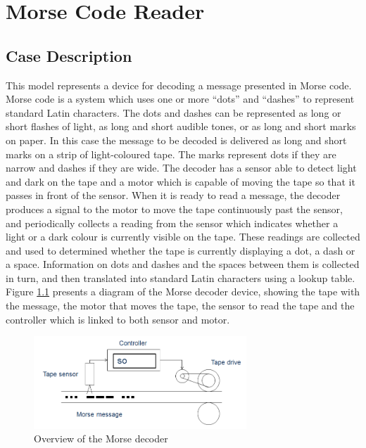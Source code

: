 \chapter{Morse Code Reader} \label{chap:morsecodereader}
\section{Case Description}
This model represents a device for decoding a message presented in
Morse code.  Morse code is a system which uses one or more ``dots''
and ``dashes'' to represent standard Latin characters.  The dots and
dashes can be represented as long or short flashes of light, as long
and short audible tones, or as long and short marks on paper.  In this
case the message to be decoded is delivered as long and short marks on
a strip of light-coloured tape.  The marks represent dots if they are
narrow and dashes if they are wide.  The decoder has a sensor able to
detect light and dark on the tape and a motor which is capable of
moving the tape so that it passes in front of the sensor.  When it is
ready to read a message, the decoder produces a signal to the motor to
move the tape continuously past the sensor, and periodically collects
a reading from the sensor which indicates whether a light or a dark
colour is currently visible on the tape.  These readings are collected
and used to determined whether the tape is currently displaying a dot,
a dash or a space.  Information on dots and dashes and the spaces
between them is collected in turn, and then translated into standard
Latin characters using a lookup table.  Figure \ref{fig:morsereader}
presents a diagram of the Morse decoder device, showing the tape with
the message, the motor that moves the tape, the sensor to read the
tape and the controller which is linked to both sensor and motor.

\begin{figure}[!ht]
\centering
\includegraphics[width=8cm]{morseCodeReader/MorseTapeReader.png}
\caption{Overview of the Morse decoder \label{fig:morsereader}}
\end{figure} 

